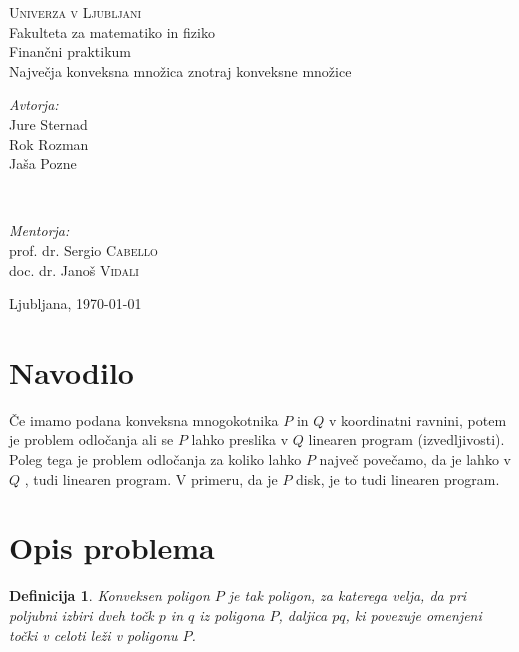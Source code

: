 \documentclass[a4paper, 12pt]{article}
\newtheorem{definicija}{Definicija}
\begin{document}
\begin{titlepage}
    \begin{center}
        \textsc{\LARGE Univerza v Ljubljani}\\[0.5cm]
        {\Large Fakulteta za matematiko in fiziko}\\[3cm]
        {\large Finančni praktikum}\\[0.5cm]
        {\huge Največja konveksna množica znotraj konveksne množice}\\[10.0cm]
    \end{center}

    \begin{minipage}{0.4\textwidth}
		\begin{flushleft}
			\large
			\textit{Avtorja:}\\
			Jure Sternad \\
			Rok Rozman \\
            Jaša Pozne
		\end{flushleft}
	\end{minipage}
	~
	\begin{minipage}{0.4\textwidth}
		\begin{flushright}
			\large
			\textit{Mentorja:}\\
			prof. dr. Sergio \textsc{Cabello} \\
			doc. dr. Janoš \textsc{Vidali}
		\end{flushright}
	\end{minipage}
	
	\vfill\vfill\vfill 
	\begin{center}
	{\large{Ljubljana, \today}} 
    \end{center}
	\vfill 

\end{titlepage}

\tableofcontents

\newpage

\section{Navodilo}

Če imamo podana konveksna mnogokotnika $P$ in $Q$ v koordinatni ravnini,
 potem je problem odločanja ali se $P$ lahko preslika v $Q$ 
 linearen program (izvedljivosti). 
 Poleg tega je problem odločanja za koliko lahko $P$ največ povečamo,
  da je lahko v $Q$ , tudi linearen program.
   V primeru, da je $P$ disk, je to tudi linearen program.


\section{Opis problema}
\begin{definicija}
    Konveksen poligon $P$ je tak poligon, za katerega velja, da pri poljubni izbiri dveh točk $p$ in $q$
     iz poligona $P$, daljica $pq$, ki povezuje omenjeni točki v celoti leži v poligonu $P$.
\end{definicija}
\end{document}
